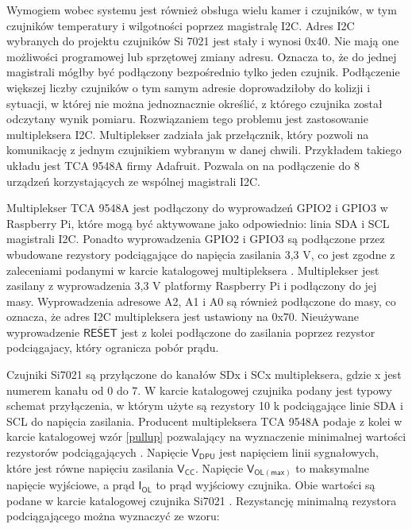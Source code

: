\documentclass[a4paper,11pt,twoside]{article}
\begin{document}
Wymogiem wobec systemu jest również obsługa wielu kamer i czujników, w tym czujników temperatury i wilgotności poprzez magistralę I2C. Adres I2C wybranych do projektu czujników Si 7021 jest stały i wynosi 0x40. Nie mają one możliwości programowej lub sprzętowej zmiany adresu. Oznacza to, że do jednej magistrali mógłby być podłączony bezpośrednio tylko jeden czujnik. Podłączenie większej liczby czujników o tym samym adresie doprowadziłoby do kolizji i sytuacji, w której nie można jednoznacznie określić, z którego czujnika został odczytany wynik pomiaru. Rozwiązaniem tego problemu jest zastosowanie multipleksera I2C. Multiplekser zadziała jak przełącznik, który pozwoli na komunikację z jednym czujnikiem wybranym w danej chwili. Przykładem takiego układu jest TCA 9548A firmy Adafruit. Pozwala on na podłączenie do 8 urządzeń korzystających ze wspólnej magistrali I2C.

Multiplekser TCA 9548A jest podłączony do wyprowadzeń GPIO2 i GPIO3 w Raspberry Pi, które mogą być aktywowane jako odpowiednio: linia SDA i SCL magistrali I2C. Ponadto wyprowadzenia GPIO2 i GPIO3 są podłączone przez wbudowane rezystory podciągające do napięcia zasilania 3,3 V\cite{rpi_schematic}, co jest zgodne z zaleceniami podanymi w karcie katalogowej multipleksera \cite{multiplekser}. Multiplekser jest zasilany z wyprowadzenia 3,3 V platformy Raspberry Pi i podłączony do jej masy. Wyprowadzenia adresowe A2, A1 i A0 są również podłączone do masy, co oznacza, że adres I2C multipleksera jest ustawiony na 0x70. Nieużywane wyprowadzenie $\overline{\mathsf{RESET}}$ jest z kolei podłączone do zasilania poprzez rezystor podciągajacy, który ogranicza pobór prądu.

Czujniki Si7021 są przyłączone do kanałów SDx i SCx multipleksera, gdzie x jest numerem kanału od 0 do 7. W karcie katalogowej czujnika podany jest typowy schemat przyłączenia, w którym użyte są rezystory 10 k\textOmega\hspace{0.2em} podciągające  linie SDA i SCL do napięcia zasilania. Producent multipleksera TCA 9548A podaje z kolei w karcie katalogowej wzór \ref{pullup} pozwalający na wyznaczenie minimalnej wartości rezystorów podciągających \cite{multiplekser}. Napięcie $\mathsf{V_{DPU}}$ jest napięciem linii sygnałowych, które jest równe napięciu zasilania $\mathsf{V_{CC}}$. Napięcie $\mathsf{V_{OL(max)}}$ to maksymalne napięcie wyjściowe, a prąd $\mathsf{I_{OL}}$ to prąd wyjściowy czujnika. Obie wartości są podane w karcie katalogowej czujnika Si7021 \cite{czujnik_temp}. Rezystancję minimalną rezystora podciągającego można wyznaczyć ze wzoru:
\end{document}
